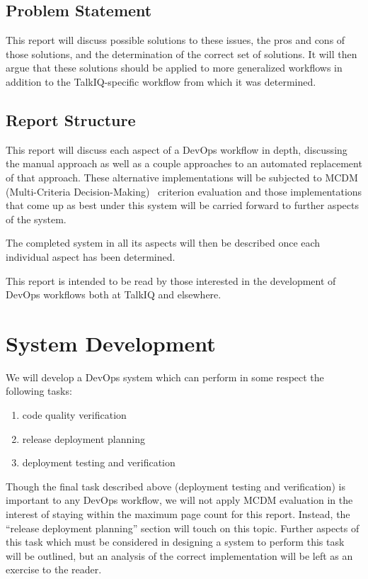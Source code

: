 \documentclass[12pt]{article}
\begin{document}
\subsection{Problem Statement}
This report will discuss possible solutions to these issues, the pros and cons of those solutions, and the determination of the correct set of solutions. It will then argue that these solutions should be applied to more generalized workflows in addition to the TalkIQ-specific workflow from which it was determined.

\subsection{Report Structure}
This report will discuss each aspect of a DevOps workflow in depth, discussing the manual approach as well as a couple approaches to an automated replacement of that approach. These alternative implementations will be subjected to MCDM (Multi-Criteria Decision-Making)~\cite{mcda} criterion evaluation and those implementations that come up as best under this system will be carried forward to further aspects of the system.

The completed system in all its aspects will then be described once each individual aspect has been determined.

This report is intended to be read by those interested in the development of DevOps workflows both at TalkIQ and elsewhere.
\newpage


\section{System Development}
We will develop a DevOps system which can perform in some respect the following tasks:
\begin{enumerate}
\item code quality verification
\item release deployment planning
\item deployment testing and verification
\end{enumerate}

Though the final task described above (deployment testing and verification) is important to any DevOps workflow, we will not apply MCDM evaluation in the interest of staying within the maximum page count for this report. Instead, the ``release deployment planning'' section will touch on this topic. Further aspects of this task which must be considered in designing a system to perform this task will be outlined, but an analysis of the correct implementation will be left as an exercise to the reader.
\end{document}
